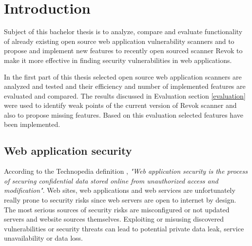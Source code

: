
\newcommand{\todo}[1]{\textcolor{red}{TODO\:} \textcolor{gray}{#1}}

\chapter{Introduction}\label{introduction}

Subject of this bachelor thesis is to analyze, compare and evaluate functionality of already existing open source web application vulnerability scanners and to propose and implement new features to recently open sourced scanner Revok \cite{Revok} to make it more effective in finding security vulnerabilities in web applications.

In the first part of this thesis selected open source web application scanners are analyzed and tested and their efficiency and number of implemented features are evaluated and compared. The results discussed in Evaluation section \ref{evaluation} were used to identify weak points of the current version of Revok scanner and also to propose missing features. Based on this evaluation selected features have been implemented.

	\section{Web application security}


	According to the Technopedia definition \cite{technopedia-web-app-security-definition}, \emph{"Web application security is the process of securing confidential data stored online from unauthorized access and modification"}. Web sites, web applications and web services are unfortunately really prone to security risks since web servers are open to internet by design. The most serious sources of security risks are misconfigured or not updated servers and website sources themselves. Exploiting or misusing discovered vulnerabilities or security threats can lead to potential private data leak, service unavailability or data loss.
	
